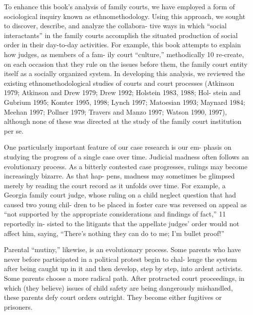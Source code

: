 To enhance this book’s analysis of family courts, we have employed
a form of sociological inquiry known as ethnomethodology. Using this
approach, we sought to discover, describe, and analyze the collabora-
tive ways in which “social interactants” in the family courts accomplish
the situated production of social order in their day-to-day activities. For
example, this book attempts to explain how judges, as members of a fam-
ily court “culture,” methodically 10 re-create, on each occasion that they
rule on the issues before them, the family court entity itself as a socially
organized system. In developing this analysis, we reviewed the existing
ethnomethodological studies of courts and court processes (Atkinson
1979; Atkinson and Drew 1979; Drew 1992; Holstein 1983, 1988; Hol-
stein and Gubrium 1995; Komter 1995, 1998; Lynch 1997; Matoesian
1993; Maynard 1984; Meehan 1997; Pollner 1979; Travers and Manzo
1997; Watson 1990, 1997), although none of these was directed at the
study of the family court institution per se. \pfl{}


One particularly important feature of our case research is our em-
phasis on studying the progress of a single case over time. Judicial
madness often follows an evolutionary process. As a bitterly contested
case progresses, rulings may become increasingly bizarre. As that hap-
pens, madness may sometimes be glimpsed merely by reading the court
record as it unfolds over time. For example, a Georgia family court judge,
whose ruling on a child neglect question that had caused two young chil-
dren to be placed in foster care was reversed on appeal as “not supported
by the appropriate considerations and findings of fact,” 11 reportedly in-
sisted to the litigants that the appellate judges’ order would not affect
him, saying, “There’s nothing they can do to me; I’m bullet proof!” \pfl{}


Parental “mutiny,” likewise, is an evolutionary process. Some parents
who have never before participated in a political protest begin to chal-
lenge the system after being caught up in it and then develop, step by
step, into ardent activists. Some parents choose a more radical path.
After protracted court proceedings, in which (they believe) issues of
child safety are being dangerously mishandled, these parents defy court
orders outright. They become either fugitives or prisoners. \pfl{}


